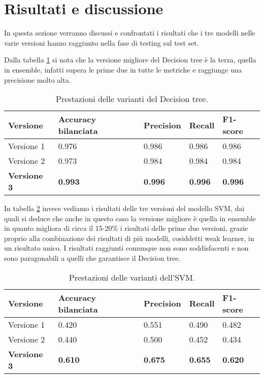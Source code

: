 \section{Risultati e discussione}\label{sec:risultati}
In questa sezione verranno discussi e confrontati i risultati che i tre modelli nelle varie versioni hanno raggiunto nella fase di testing sul test set.

Dalla tabella \ref{tab:resdt} si nota che la versione migliore del Decision tree è la terza, quella in ensemble, infatti supera le prime due in tutte le metriche e raggiunge una precisione molto alta.

\begin{table}[h] 
\centering
\begin{tabular}{l l l l l}
\hline
\textbf{Versione} & \textbf{Accuracy bilanciata} & \textbf{Precision} & \textbf{Recall} & \textbf{F1-score}\\
\hline
Versione 1 & 0.976 & 0.986 & 0.986 & 0.986 \\
Versione 2 & 0.973 & 0.984 & 0.984 & 0.984 \\
\textbf{Versione 3} & \textbf{0.993} & \textbf{0.996} & \textbf{0.996} & \textbf{0.996} \\
\hline
\end{tabular}
\caption{Prestazioni delle varianti del Decision tree.}
\label{tab:resdt}
\end{table}

In tabella \ref{tab:ressvm} invece vediamo i risultati delle tre versioni del modello SVM, dai quali si deduce che anche in questo caso la versione migliore è quella in ensemble in quanto migliora di circa il 15-20\% i risultati delle prime due versioni, grazie proprio alla combinazione dei risultati di più modelli, cosiddetti weak learner, in un risultato unico. I risultati raggiunti comunque non sono soddisfacenti e non sono paragonabili a quelli che garantisce il Decision tree.

\begin{table}[h] 
\centering
\begin{tabular}{l l l l l}
\hline
\textbf{Versione} & \textbf{Accuracy bilanciata} & \textbf{Precision} & \textbf{Recall} & \textbf{F1-score}\\
\hline
Versione 1 & 0.420 & 0.551 & 0.490 & 0.482 \\
Versione 2 & 0.440 & 0.500 & 0.452 & 0.434 \\
\textbf{Versione 3} & \textbf{0.610} & \textbf{0.675} & \textbf{0.655 } & \textbf{0.620} \\
\hline
\end{tabular}
\caption{Prestazioni delle varianti dell'SVM.}
\label{tab:ressvm}
\end{table}

